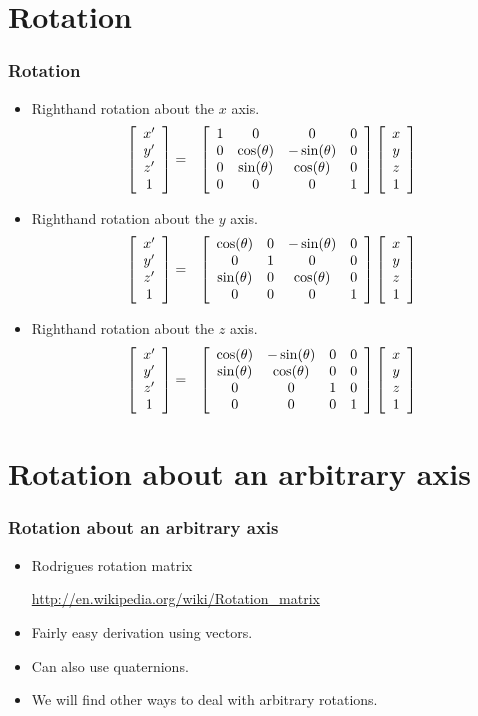\documentclass[slidestop,xcolor=pst,dvips]{beamer}
\newcommand{\sect}[1]{
\section{#1}
\begin{frame}[fragile]\frametitle{#1}
}
\begin{document}
\sect{Rotation}
\begin{itemize}
\item Righthand rotation about the $x$ axis.
\begin{eqnarray*}
\left[\begin{array}{c} x'\\y'\\z' \\ 1\end{array}\right] &=& 
\left[\begin{array}{cccc} 1&0&0&0 \\ 0&\cos(\theta)&-\sin(\theta)&0 \\ 0&\sin(\theta)&\cos(\theta)&0 \\0&0&0&1\end{array}\right]\left[\begin{array}{c} x\\y\\z \\ 1\end{array}\right]
\end{eqnarray*}
\item Righthand rotation about the $y$ axis.
\begin{eqnarray*}
\left[\begin{array}{c} x'\\y'\\z' \\ 1\end{array}\right] &=& 
\left[\begin{array}{cccc} \cos(\theta)&0&-\sin(\theta)&0 \\ 0&1&0&0 \\ \sin(\theta)&0&\cos(\theta)&0 \\0&0&0&1\end{array}\right]\left[\begin{array}{c} x\\y\\z \\ 1\end{array}\right]
\end{eqnarray*}
\item Righthand rotation about the $z$ axis.
\begin{eqnarray*}
\left[\begin{array}{c} x'\\y'\\z' \\ 1\end{array}\right] &=& 
\left[\begin{array}{cccc} \cos(\theta)&-\sin(\theta)&0&0 \\ \sin(\theta)&\cos(\theta)&0&0 \\ 0&0&1&0 \\0&0&0&1\end{array}\right]\left[\begin{array}{c} x\\y\\z \\ 1\end{array}\right]
\end{eqnarray*}
\end{itemize}
\end{frame}

\sect{Rotation about an arbitrary axis}

\begin{itemize}
\item
Rodrigues rotation matrix

\url{http://en.wikipedia.org/wiki/Rotation_matrix}

\item Fairly easy derivation using vectors.
\item Can also use quaternions.
\item
We will find other ways to deal with arbitrary rotations.
\end{itemize}

\end{frame}

\newcommand{\bluebox}[4]{
\pspolygon[showpoints=true,fillstyle=solid,fillcolor=blue](#1,#2)(#1,#4)(#3,#4)(#3,#2)
\rput[tr](#1,#2){\tiny$(#1,#2)$}
\rput[bl](#3,#4){\tiny$(#3,#4)$}
}
\end{document}
